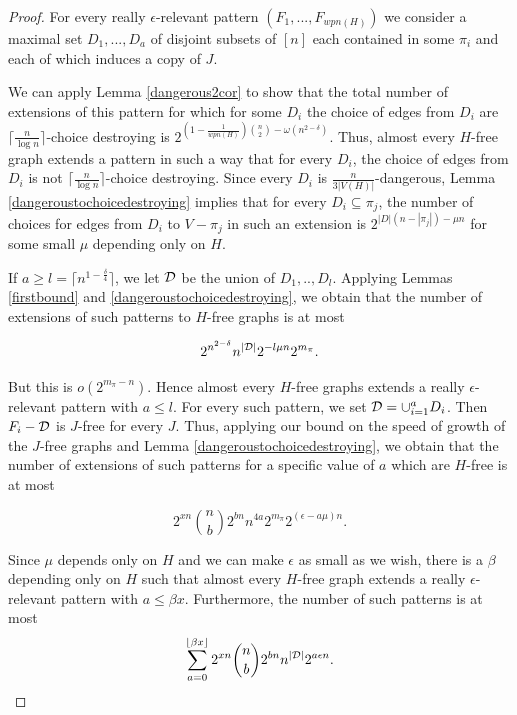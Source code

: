\documentclass[12pt]{article}
\theoremstyle{definition}
\begin{document}
\begin{proof}
    For every really $\epsilon$-relevant pattern $(F_1,...,F_{wpn(H)})$ we consider a maximal set $D_1,...,D_a$  of disjoint subsets of $[n]$ each contained in some $\pi_i$ and each of which induces a copy of $J$.
    
     We can apply Lemma \ref{dangerous2cor} to show that the total number of extensions of this pattern for which for some $D_i$  the choice of edges from $D_i$ are $\lceil \frac{n}{\log n} \rceil$-choice destroying is $2^{(1-\frac{1}{wpn(H)}){n \choose 2}-\omega(n^{2-\delta})}$. Thus, almost every $H$-free graph extends a pattern in such a way that for every $D_i$, the choice of edges from $D_i$ is not  $\lceil \frac{n}{\log n} \rceil$-choice destroying. Since  every $D_i$ is $\frac{n}{3|V(H)|}$-dangerous, Lemma \ref{dangeroustochoicedestroying} implies that for every $D_i \subseteq \pi_j$, the number of choices for edges from $D_i$ to $V-\pi_j$ in such an extension is $2^{|D|(n-|\pi_j|)-\mu n}$ for  some small $\mu$ depending only on $H$. 

     If   $a \ge l=\lceil n^{1-\frac{\delta}{4}} \rceil$, we let ${\cal D}$ be the union of $D_1,..,D_l$. 
     Applying Lemmas \ref{firstbound} and \ref{dangeroustochoicedestroying}, we obtain that the number of extensions of  such patterns to $H$-free graphs is at most  
    
     $$2^{n^{2-\delta}}n^{|\cal D|}2^{-l\mu n}2^{m_\pi}.$$

     But this is $o(2^{m_\pi-n})$. Hence almost every $H$-free graphs extends a really $\epsilon$-relevant pattern with 
     $a \le l$. For every such pattern,  we set ${\cal D}=\cup_{i=1}^a D_i$.   Then $F_i-{\cal D}$ is $J$-free for every $J$. Thus, applying our bound on the speed of growth of the $J$-free graphs and Lemma \ref{dangeroustochoicedestroying}, we obtain that the number of extensions of  such patterns  for a specific value of $a$ which are $H$-free is at most 
    
     $$2^{xn}{n \choose b}2^{bn}n^{4a} 2^{m_\pi}2^{(\epsilon -a\mu) n}.$$
    
    Since $\mu$ depends only on $H$ and we can make $\epsilon$ as small as we wish, there is a $\beta$
    depending only on $H$ such that almost  every $H$-free graph extends a really $\epsilon$-relevant pattern with $a \le \beta x$. Furthermore, the number of such patterns  is at most 
         $$\sum_{a=0}^{\lfloor \beta x \rfloor}2^{xn}{n \choose b}2^{bn}n^{|\cal D|}2^{ a\epsilon n}.$$
\end{proof}
\end{document}
